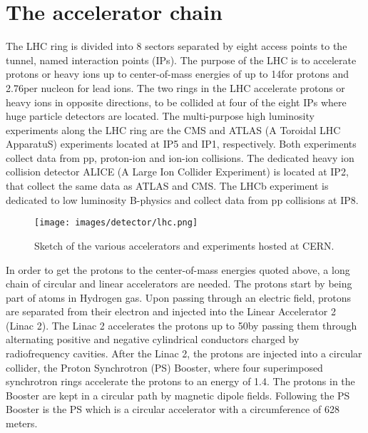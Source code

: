 \section{The accelerator chain}
\noindent\justify
The LHC ring is divided into 8 sectors separated by eight access points to the tunnel, named interaction points (IPs). 
The purpose of the LHC is to accelerate protons or heavy ions up to center-of-mass energies of up to 14\TeV for protons and 2.76\TeV per nucleon for lead ions. 
The two rings in the LHC accelerate protons or heavy ions in opposite directions, to be collided at four of the eight IPs where huge particle detectors are located.
The multi-purpose high luminosity experiments along the LHC ring are the CMS \cite{Chatrchyan:2008aa} and ATLAS (A Toroidal LHC ApparatuS) \cite{Armstrong:1994it} experiments located at IP5 and IP1, respectively. 
Both experiments collect data from pp, proton-ion and ion-ion collisions.
The dedicated heavy ion collision detector ALICE (A Large Ion Collider Experiment) \cite{alice} is located at IP2, that collect the same data as ATLAS and CMS. 
The LHCb \cite{CERN-LHCC-98-004} experiment is dedicated to low luminosity B-physics and collect data from pp collisions at IP8.                                  
\noindent
\justify
\begin{figure}[!htp]
  \centering
   \texttt{[image: images/detector/lhc.png]}
   \caption{Sketch of the various accelerators and experiments hosted at CERN.}
   \label{fig:LHC}
\end{figure}                                                                                                                                                                                    
In order to get the protons to the center-of-mass energies quoted above, a long chain of circular and linear accelerators are needed. 
The protons start by being part of atoms in Hydrogen gas. 
Upon passing through an electric field, protons are separated from their electron and injected into the Linear Accelerator 2 (Linac 2). 
The Linac 2 accelerates the protons up to 50\MeV by passing them through alternating positive and negative cylindrical conductors charged by radiofrequency cavities. 
After the Linac 2, the protons are injected into a circular collider, the Proton Synchrotron (PS) Booster, where four superimposed synchrotron rings accelerate the protons to an energy of 1.4\GeV. 
The protons in the Booster are kept in a circular path by magnetic dipole fields.
Following the PS Booster is the PS which is a circular accelerator with a circumference of 628 meters. 
